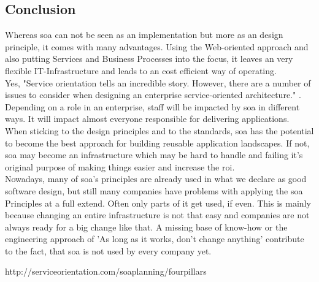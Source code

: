 \documentclass[12pt]{article}
\begin{document}
\subsection{Conclusion}
Whereas \gls{soa} can not be seen as an implementation but more as an design principle, it comes with many advantages. Using the Web-oriented approach and also putting Services and Business Processes into the focus, it leaves an very flexible IT-Infrastructure and leads to an cost efficient way of operating.\\
Yes, "Service orientation tells an incredible story. However, there are a number of issues to consider when designing an enterprise service-oriented architecture." \cite{pcsoa}. Depending on a role in an enterprise, staff will be impacted by \gls{soa} in different ways. It will impact almost everyone responsible for delivering applications. When sticking to the design principles and to the standards, \gls{soa} has the potential to become the best approach for building reusable application landscapes. If not, \gls{soa} may become an infrastructure which may be hard to handle and failing it's original purpose of making things easier and increase the \gls{roi}.\\
Nowadays, many of \gls{soa}'s principles are already used in what we declare as good software design, but still many companies have problems with applying the \gls{soa} Principles at a full extend. Often only parts of it get used, if even. This is mainly because changing an entire infrastructure is not that easy and companies are not always ready for a big change like that. A missing base of know-how or the engineering approach of 'As long as it works, don't change anything' contribute to the fact, that \gls{soa} is not used by every company yet.

http://serviceorientation.com/soaplanning/fourpillars





\newpage
\end{document}
